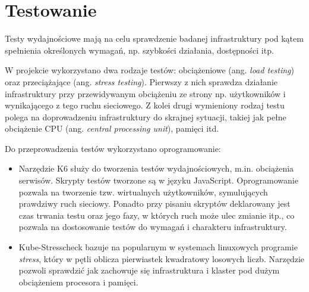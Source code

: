 \section{Testowanie}

Testy wydajnościowe mają na celu sprawdzenie badanej infrastruktury pod kątem spełnienia określonych wymagań, np. szybkości działania, dostępności itp. 

W projekcie wykorzystano dwa rodzaje testów: obciążeniowe (ang. \textit{load testing}) oraz przeciążające (ang. \textit{stress testing}). Pierwszy z nich sprawdza działanie infrastruktury przy przewidywanym obciążeniu ze strony np. użytkowników i wynikającego z tego ruchu sieciowego. Z kolei drugi wymieniony rodzaj testu polega na doprowadzeniu infrastruktury do skrajnej sytuacji, takiej jak pełne obciążenie CPU (ang. \textit{central processing unit}), pamięci itd.

Do przeprowadzenia testów wykorzystano oprogramowanie:
\begin{itemize}
    \item Narzędzie K6 \cite{k6} służy do tworzenia testów wydajnościowych, m.in. obciążenia serwisów. Skrypty testów tworzone są w języku JavaScript. Oprogramowanie pozwala na tworzenie tzw. wirtualnych użytkowników, symulujących prawdziwy ruch sieciowy. Ponadto przy pisaniu skryptów deklarowany jest czas trwania testu oraz jego fazy, w których ruch może ulec zmianie itp., co pozwala na dostosowanie testów do wymagań i charakteru infrastruktury. 

    
    \item Kube-Stresscheck \cite{stress} bazuje na popularnym w systemach linuxowych programie \textit{stress}, który w pętli oblicza pierwiastek kwadratowy losowych liczb. Narzędzie pozwoli sprawdzić jak zachowuje się infrastruktura i klaster pod dużym obciążeniem procesora i pamięci. 
\end{itemize}